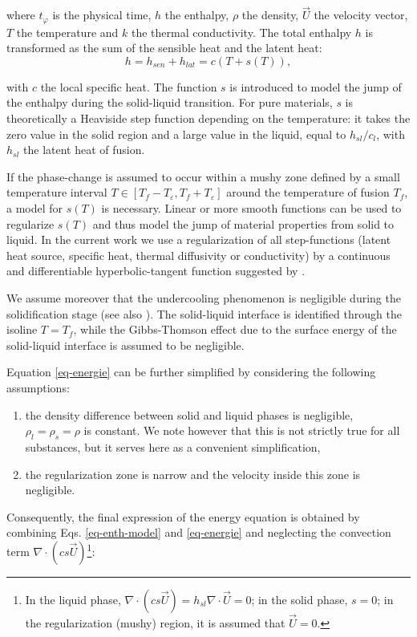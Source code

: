 \noindent where $t_{\varphi}$ is the physical time, $h$ the enthalpy, $\rho$ the density, $\vec{U}$  the velocity vector, $T$ the temperature and $k$ the thermal conductivity. 
The total enthalpy $h$ is transformed as the sum of the sensible heat and the latent heat:
\begin{equation}
\label{eq-enth-model}
  h = h_{sen} + h_{lat} = c ( T + s(T) ),
\end{equation} 

\noindent with $c$ the local specific heat. The function $s$ is introduced to model the jump of the enthalpy during the solid-liquid transition.  For pure materials, $s$ is theoretically  a Heaviside step function depending on the temperature: it takes the zero value in the solid region and a large value in the liquid, equal to $h_{sl}/c_l$, with $h_{sl}$ the latent heat of fusion. 

\noindent If the phase-change is assumed to occur within a mushy zone defined by a small temperature interval $  T \in [T_f - T_\varepsilon, T_f + T_\varepsilon] $ around the temperature of fusion $T_f$, a model for $s(T)$ is necessary. 
Linear  \citep{voller1987pcm,Wang2010} or more smooth functions \citep{dan-2014-JCP} can be used to regularize $s(T)$ and thus model the jump of material properties from solid to liquid.  
In the current work we use a regularization of all step-functions (latent heat source, specific heat, thermal diffusivity or conductivity) by a continuous and differentiable hyperbolic-tangent function suggested by \cite{dan-2014-JCP}.

\noindent We assume moreover that the undercooling phenomenon is negligible during the solidification stage (see also \cite{wang2010numerical,kowalewski2004phase}).
The solid-liquid interface is identified through the isoline $T=T_f$, while the Gibbs-Thomson effect due to the surface energy of the solid-liquid interface is assumed to be negligible.%

\noindent Equation \eqref{eq-energie} can be further simplified by considering the following assumptions: 
\begin{enumerate}[label=(\roman*)]
\item the density difference between solid and liquid phases is negligible, \ie $\rho_l=\rho_s=\rho$ is constant. 
We note however that this is not strictly true for all substances, but it serves here as a convenient simplification,
\item the regularization zone is narrow and the velocity inside this zone is negligible. 
\end{enumerate}
Consequently, the final expression of the energy equation is obtained by combining Eqs. \eqref{eq-enth-model}  and \eqref{eq-energie} and  neglecting the convection term $\nabla \cdot ( c s \vec{U})$\footnote{In the liquid phase, $\nabla \cdot ( c s \vec{U})  = h_{sl} \nabla \cdot  \vec{U}=0$; in the solid phase, $s=0$; in the regularization (mushy) region, it is assumed that $\vec{U}=0.$}:\\

